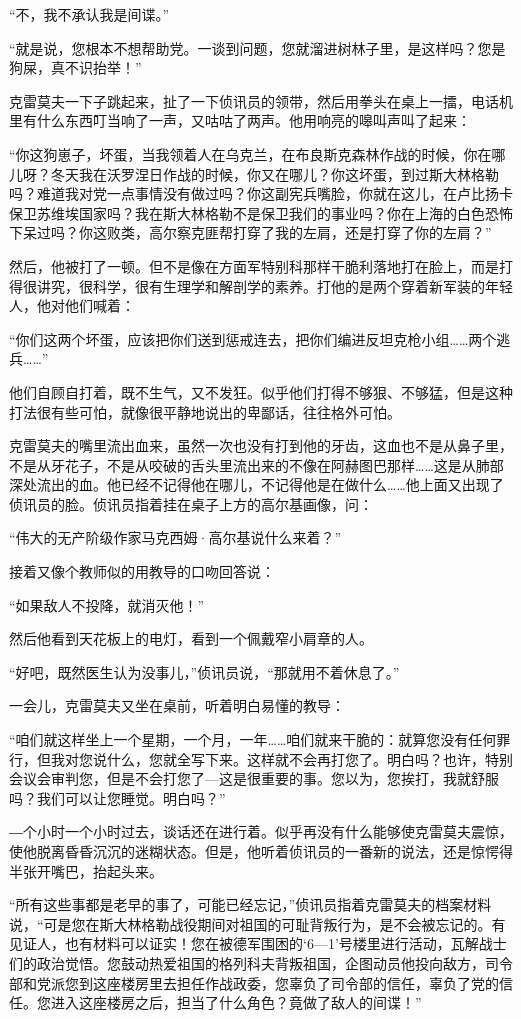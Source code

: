 “不，我不承认我是间谍。”

“就是说，您根本不想帮助党。一谈到问题，您就溜进树林子里，是这样吗？您是狗屎，真不识抬举！”

克雷莫夫一下子跳起来，扯了一下侦讯员的领带，然后用拳头在桌上一擂，电话机里有什么东西叮当响了一声，又咕咕了两声。他用响亮的嗥叫声叫了起来：

“你这狗崽子，坏蛋，当我领着人在乌克兰，在布良斯克森林作战的时候，你在哪儿呀？冬天我在沃罗涅日作战的时候，你又在哪儿？你这坏蛋，到过斯大林格勒吗？难道我对党一点事情没有做过吗？你这副宪兵嘴脸，你就在这儿，在卢比扬卡保卫苏维埃国家吗？我在斯大林格勒不是保卫我们的事业吗？你在上海的白色恐怖下呆过吗？你这败类，高尔察克匪帮打穿了我的左肩，还是打穿了你的左肩？”

然后，他被打了一顿。但不是像在方面军特别科那样干脆利落地打在脸上，而是打得很讲究，很科学，很有生理学和解剖学的素养。打他的是两个穿着新军装的年轻人，他对他们喊着：

“你们这两个坏蛋，应该把你们送到惩戒连去，把你们编进反坦克枪小组……两个逃兵……”

他们自顾自打着，既不生气，又不发狂。似乎他们打得不够狠、不够猛，但是这种打法很有些可怕，就像很平静地说出的卑鄙话，往往格外可怕。

克雷莫夫的嘴里流出血来，虽然一次也没有打到他的牙齿，这血也不是从鼻子里，不是从牙花子，不是从咬破的舌头里流出来的不像在阿赫图巴那样……这是从肺部深处流出的血。他已经不记得他在哪儿，不记得他是在做什么……他上面又出现了侦讯员的脸。侦讯员指着挂在桌子上方的高尔基画像，问：

“伟大的无产阶级作家马克西姆·高尔基说什么来着？”

接着又像个教师似的用教导的口吻回答说：

“如果敌人不投降，就消灭他！”

然后他看到天花板上的电灯，看到一个佩戴窄小肩章的人。

“好吧，既然医生认为没事儿，”侦讯员说，“那就用不着休息了。”

一会儿，克雷莫夫又坐在桌前，听着明白易懂的教导：

“咱们就这样坐上一个星期，一个月，一年……咱们就来干脆的：就算您没有任何罪行，但我对您说什么，您就全写下来。这样就不会再打您了。明白吗？也许，特别会议会审判您，但是不会打您了—这是很重要的事。您以为，您挨打，我就舒服吗？我们可以让您睡觉。明白吗？”

―个小时一个小时过去，谈话还在进行着。似乎再没有什么能够使克雷莫夫震惊，使他脱离昏昏沉沉的迷糊状态。但是，他听着侦讯员的一番新的说法，还是惊愕得半张开嘴巴，抬起头来。

“所有这些事都是老早的事了，可能已经忘记，”侦讯员指着克雷莫夫的档案材料说，“可是您在斯大林格勒战役期间对祖国的可耻背叛行为，是不会被忘记的。有见证人，也有材料可以证实！您在被德军围困的‘6—1’号楼里进行活动，瓦解战士们的政治觉悟。您鼓动热爱祖国的格列科夫背叛祖国，企图动员他投向敌方，司令部和党派您到这座楼房里去担任作战政委，您辜负了司令部的信任，辜负了党的信任。您进入这座楼房之后，担当了什么角色？竟做了敌人的间谍！”

